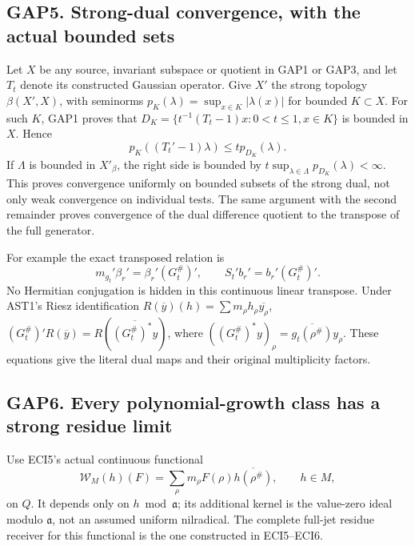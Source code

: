 \subsection{GAP5. Strong-dual convergence, with the actual bounded
sets}\label{gap5.-strong-dual-convergence-with-the-actual-bounded-sets}

Let \(X\) be any source, invariant subspace or quotient in GAP1 or GAP3,
and let \(T_t\) denote its constructed Gaussian operator. Give \(X'\)
the strong topology \(\beta(X',X)\), with seminorms
\(p_K(\lambda)=\sup_{x\in K}|\lambda(x)|\) for bounded \(K\subset X\).
For such \(K\), GAP1 proves that
\(D_K=\{t^{-1}(T_t-1)x:0<t\le1,x\in K\}\) is bounded in \(X\). Hence \[
p_K((T_t'-1)\lambda)\le t p_{D_K}(\lambda).
\tag{GAP5.1}
\] If \(\Lambda\) is bounded in \(X'_\beta\), the right side is bounded
by \(t\sup_{\lambda\in\Lambda}p_{D_K}(\lambda)<\infty\). This proves
convergence uniformly on bounded subsets of the strong dual, not only
weak convergence on individual tests. The same argument with the second
remainder proves convergence of the dual difference quotient to the
transpose of the full generator.

For example the exact transposed relation is \[
m_{g_t}'\beta_r'=\beta_r'(G_t^\#)',
\qquad S_t'b_r'=b_r'(G_t^\#)'.
\tag{GAP5.2}
\] No Hermitian conjugation is hidden in this continuous linear
transpose. Under AST1's Riesz identification
\(R(\overline y)(h)=\sum m_\rho h_\rho\overline{y_\rho}\),
\((G_t^\#)'R(\overline y)=R(\overline{(G_t^\#)^*y})\), where
\(((G_t^\#)^*y)_\rho=\overline{g_t(\rho^\#)}y_\rho\). These equations
give the literal dual maps and their original multiplicity factors.

\subsection{GAP6. Every polynomial-growth class has a strong residue
limit}\label{gap6.-every-polynomial-growth-class-has-a-strong-residue-limit}

Use ECI5's actual continuous functional \[
\mathcal W_M(h)(F)=\sum_\rho m_\rho F(\rho)\overline{h(\rho^\#)},
\qquad h\in M,
\tag{GAP6.1}
\] on \(Q\). It depends only on \(h\bmod\mathfrak a\); its additional
kernel is the value-zero ideal modulo \(\mathfrak a\), not an assumed
uniform nilradical. The complete full-jet residue receiver for this
functional is the one constructed in ECI5--ECI6.

